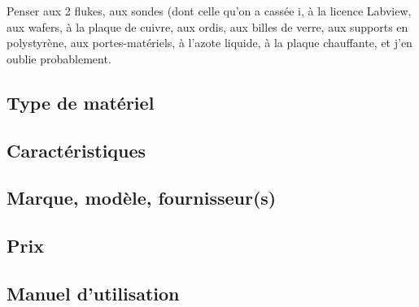 Penser aux 2 flukes, aux sondes (dont celle qu'on a cassée ^^),
à la licence Labview, aux wafers, à la plaque de cuivre, aux ordis, 
aux billes de verre, aux supports en polystyrène, aux portes-matériels, 
à l'azote liquide, à la plaque chauffante, et j'en oublie probablement.

\subsection{Type de matériel}
\subsection{Caractéristiques}
\subsection{Marque, modèle, fournisseur(s)}
\subsection{Prix}
\subsection{Manuel d'utilisation}

